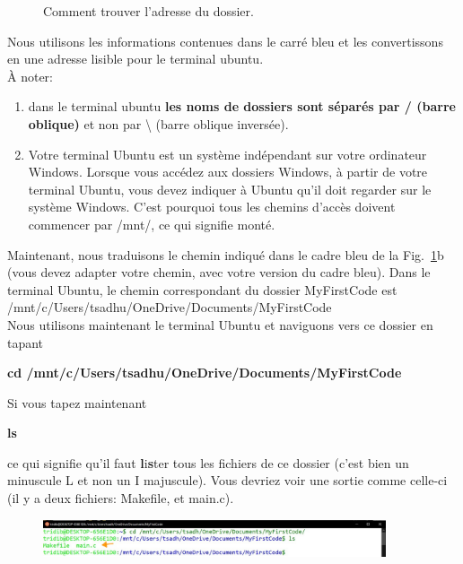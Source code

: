 \documentclass{article}
\newcommand\subfig[2]{{Fig.~\ref{#1}{#2}}}
\begin{document}
\begin{figure}[H]
\begin{subfigure}[c]{0.5\textwidth}
\end{subfigure}
\caption{Comment trouver l'adresse du dossier.\label{F:FindFolderAddress}}
\end{figure}
Nous utilisons les informations contenues dans le carré bleu et les convertissons en une adresse lisible pour le terminal ubuntu. \\
À noter:
\begin{enumerate}
\item dans le terminal ubuntu \textbf{les noms de dossiers sont séparés par / {\color{Bittersweet}(barre oblique)}} et non par \textbackslash{} (barre oblique inversée).
\item Votre terminal Ubuntu est un système indépendant sur votre ordinateur Windows. Lorsque vous accédez aux dossiers Windows, à partir de votre terminal Ubuntu, vous devez indiquer à Ubuntu qu'il doit regarder sur le système Windows. C'est pourquoi tous les chemins d'accès doivent commencer par /mnt/, ce qui signifie monté.
\end{enumerate}
Maintenant, nous traduisons le chemin indiqué dans le cadre bleu de la \subfig{F:FindFolderAddress}{b} (vous devez adapter votre chemin, avec votre version du cadre bleu). Dans le terminal Ubuntu, le chemin correspondant du dossier MyFirstCode est\\
/mnt/c/Users/tsadhu/OneDrive/Documents/MyFirstCode\\

Nous utilisons maintenant le terminal Ubuntu et naviguons vers ce dossier en tapant
\begin{tcolorbox}[width=\textwidth,colframe=BurntOrange,colback={black},title={ubuntu terminal},outer arc=0mm,colupper=white]  
    \large\textbf{  cd /mnt/c/Users/tsadhu/OneDrive/Documents/MyFirstCode }
\end{tcolorbox}
Si vous tapez maintenant 
\begin{tcolorbox}[width=\textwidth,colframe=BurntOrange,colback={black},title={ubuntu terminal},outer arc=0mm,colupper=white] 
      \large\textbf{ ls }
\end{tcolorbox}
ce qui signifie qu'il faut \textbf{l}i\textbf{s}ter tous les fichiers de ce dossier (c'est bien un minuscule L et non un I majuscule). Vous devriez voir une sortie comme celle-ci (il y a deux fichiers: Makefile, et main.c).
\begin{figure}[H]
\center
\includegraphics[width=0.9\textwidth]{Plots/FirstCode_5.jpeg}
\end{figure}
\end{document}
